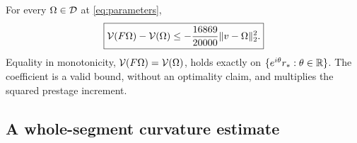 \begin{theorem}\label{thm:finite}
For every \(\Omega\in\mathcal D\) at \eqref{eq:parameters},
\begin{equation}
\boxed{\mathcal V(F\Omega)-\mathcal V(\Omega)
\le-\frac{16869}{20000}\|v-\Omega\|_2^2.}
\label{eq:finitedescent}
\end{equation}
Equality in monotonicity, \(\mathcal V(F\Omega)=\mathcal V(\Omega)\), holds exactly on
\(\{e^{i\theta}r_*:\theta\in\mathbb R\}\). The coefficient is a valid bound, without an optimality claim, and multiplies the squared prestage increment.
\end{theorem}

\subsection{A whole-segment curvature estimate}
